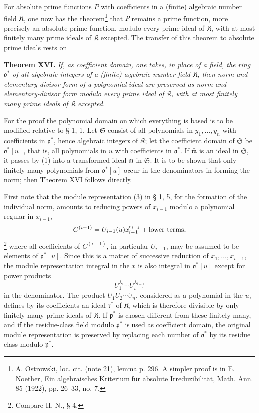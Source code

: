 \documentclass[11pt]{article}
\providecommand{\frakS}{\mathfrak S}
\providecommand{\frakm}{\mathfrak m}
\providecommand{\frakp}{\mathfrak p}
\begin{document}
For absolute prime functions $P$ with coefficients in a (finite) algebraic number field $\mathfrak K$, one now has the theorem\footnote{A. Ostrowski, loc. cit. (note 21), lemma p. 296. A simpler proof is in E. Noether, Ein algebraisches Kriterium für absolute Irreduzibilität, Math. Ann. 85 (1922), pp. 26--33, no. 7.} that $P$ remains a prime function, more precisely an absolute prime function, modulo every prime ideal of $\mathfrak K$, with at most finitely many prime ideals of $\mathfrak K$ excepted. The transfer of this theorem to absolute prime ideals rests on

\textbf{Theorem XVI.} \emph{If, as coefficient domain, one takes, in place of a field, the ring $\mathfrak o^*$ of all algebraic integers of a (finite) algebraic number field $\mathfrak K$, then norm and elementary-divisor form of a polynomial ideal are preserved as norm and elementary-divisor form modulo every prime ideal of $\mathfrak K$, with at most finitely many prime ideals of $\mathfrak K$ excepted.}

For the proof the polynomial domain on which everything is based is to be modified relative to § 1, 1. Let $\bar{\frakS}$ consist of all polynomials in $y_1,\ldots,y_n$ with coefficients in $\mathfrak o^*$, hence algebraic integers of $\mathfrak K$; let the coefficient domain of $\frakS$ be $\mathfrak o^*[u]$, that is, all polynomials in $u$ with coefficients in $\mathfrak o^*$. If $\bar{\frakm}$ is an ideal in $\bar{\frakS}$, it passes by (1) into a transformed ideal $\frakm$ in $\frakS$. It is to be shown that only finitely many polynomials from $\mathfrak o^*[u]$ occur in the denominators in forming the norm; then Theorem XVI follows directly.

First note that the module representation (3) in § 1, 5, for the formation of the individual norm, amounts to reducing powers of $x_{i-1}$ modulo a polynomial regular in $x_{i-1}$,
\[
 C^{(i-1)}=U_{i-1}(u)x_{i-1}^{e_{i-1}}+\hbox{lower terms},
\]
\footnote{Compare H.-N., § 4.} where all coefficients of $C^{(i-1)}$, in particular $U_{i-1}$, may be assumed to be elements of $\mathfrak o^*[u]$. Since this is a matter of successive reduction of $x_1,\ldots,x_{i-1}$, the module representation integral in the $x$ is also integral in $\mathfrak o^*[u]$ except for power products
\[
 U_1^{\lambda_1}\cdots U_{i-1}^{\lambda_{i-1}}
\]
in the denominator. The product $U_1U_2\cdots U_n$, considered as a polynomial in the $u$, defines by its coefficients an ideal $\mathfrak r^*$ of $\mathfrak K$, which is therefore divisible by only finitely many prime ideals of $\mathfrak K$. If $\frakp^*$ is chosen different from these finitely many, and if the residue-class field modulo $\frakp^*$ is used as coefficient domain, the original module representation is preserved by replacing each number of $\mathfrak o^*$ by its residue class modulo $\frakp^*$.
\end{document}
